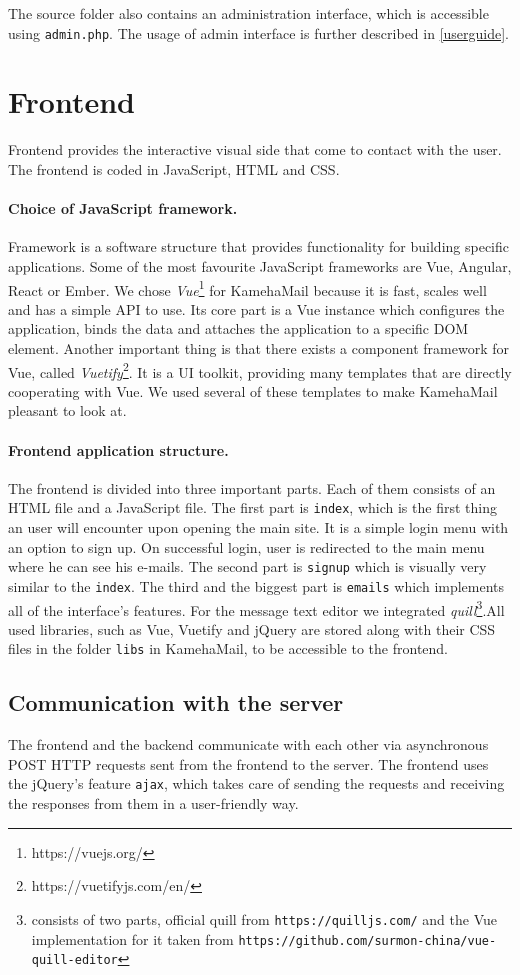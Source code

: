 The source folder also contains an administration interface, which is accessible using \texttt{admin.php}. The usage of admin interface is further described in \autoref{userguide}.

\section{Frontend}
Frontend provides the interactive visual side that come to contact with the user. The frontend is coded in JavaScript, HTML and CSS.

\paragraph{Choice of JavaScript framework.}
Framework is a software structure that provides functionality for building specific applications. Some of the most favourite JavaScript frameworks are Vue, Angular, React or Ember. We chose \emph{Vue}\footnote{https://vuejs.org/} for KamehaMail because it is fast, scales well and has a simple API to use.
Its core part is a Vue instance which configures the application, binds the data and attaches the application to a specific DOM element. Another important thing is that there exists a component framework for Vue, called \emph{Vuetify}\footnote{https://vuetifyjs.com/en/}. It is a UI toolkit, providing many templates that are directly cooperating with Vue.
We used several of these templates to make KamehaMail pleasant to look at.

\paragraph{Frontend application structure.}
The frontend is divided into three important parts. Each of them consists of an HTML file and a JavaScript file. The first part is \texttt{index}, which is the first thing an user will encounter upon opening the main site. It is a simple login menu with an option to sign up. On successful login, user is redirected to the main menu where he can see his e-mails.
The second part is \texttt{signup} which is visually very similar to the \texttt{index}. The third and the biggest part is \texttt{emails} which implements all of the interface's features.
For the message text editor we integrated \emph{quill}\footnote{consists of two parts, official quill from \texttt{https://quilljs.com/} and the Vue implementation for it taken from \texttt{https://github.com/surmon-china/vue-quill-editor}}.All used libraries, such as Vue, Vuetify and jQuery are stored along with their CSS files in the folder \texttt{libs} in KamehaMail, to be accessible to the frontend.

\subsection{Communication with the server}
The frontend and the backend communicate with each other via asynchronous POST HTTP requests sent from the frontend to the server. The frontend uses the jQuery's feature \texttt{ajax}, which takes care of sending the requests and receiving the responses from them in a user-friendly way.
